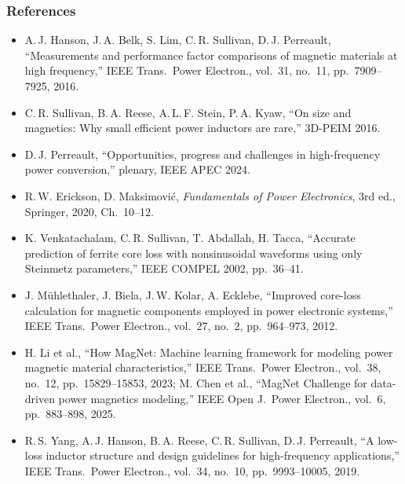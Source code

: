 \begin{frame}
	\frametitle{References}
	\scriptsize
	\begin{itemize}
		\item A.\,J. Hanson, J.\,A. Belk, S. Lim, C.\,R. Sullivan, D.\,J. Perreault, ``Measurements and performance factor comparisons of magnetic materials at high frequency,'' IEEE Trans.\ Power Electron., vol.\ 31, no.\ 11, pp.\ 7909--7925, 2016.
		\item C.\,R. Sullivan, B.\,A. Reese, A.\,L.\,F. Stein, P.\,A. Kyaw, ``On size and magnetics: Why small efficient power inductors are rare,'' 3D-PEIM 2016.
		\item D.\,J. Perreault, ``Opportunities, progress and challenges in high-frequency power conversion,'' plenary, IEEE APEC 2024.
		\item R.\,W. Erickson, D. Maksimovi\'c, \textit{Fundamentals of Power Electronics}, 3rd ed., Springer, 2020, Ch.\ 10--12.
		\item K. Venkatachalam, C.\,R. Sullivan, T. Abdallah, H. Tacca, ``Accurate prediction of ferrite core loss with nonsinusoidal waveforms using only Steinmetz parameters,'' IEEE COMPEL 2002, pp.\ 36--41.
		\item J. M\"uhlethaler, J. Biela, J.\,W. Kolar, A. Ecklebe, ``Improved core-loss calculation for magnetic components employed in power electronic systems,'' IEEE Trans.\ Power Electron., vol.\ 27, no.\ 2, pp.\ 964--973, 2012.
		\item H. Li et al., ``How MagNet: Machine learning framework for modeling power magnetic material characteristics,'' IEEE Trans.\ Power Electron., vol.\ 38, no.\ 12, pp.\ 15829--15853, 2023; M. Chen et al., ``MagNet Challenge for data-driven power magnetics modeling,'' IEEE Open J.\ Power Electron., vol.\ 6, pp.\ 883--898, 2025.
		\item R.\,S. Yang, A.\,J. Hanson, B.\,A. Reese, C.\,R. Sullivan, D.\,J. Perreault, ``A low-loss inductor structure and design guidelines for high-frequency applications,'' IEEE Trans.\ Power Electron., vol.\ 34, no.\ 10, pp.\ 9993--10005, 2019.
	\end{itemize}
\end{frame}


